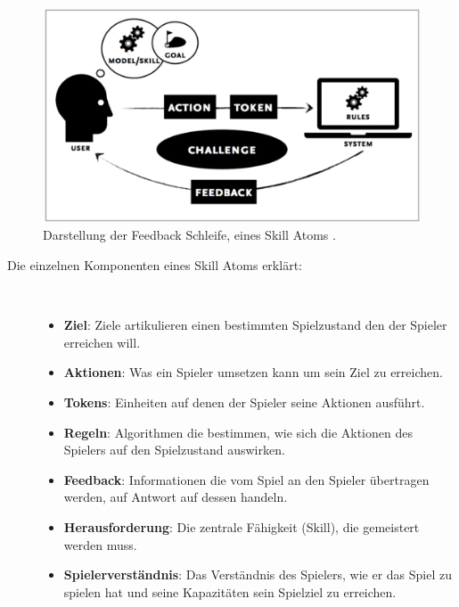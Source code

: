 \documentclass[a4paper,12pt]{scrartcl}
\begin{document}
\begin{figure}[h!]
\begin{center}
\includegraphics[scale = 0.6]{Bilder/SkillAtoms.eps}
\caption{Darstellung der Feedback Schleife, eines Skill Atoms \cite{Deterding2013}.}
\label{SkillAtomBild}
\end{center}
\end{figure}
\begin{description}
   \item[Die einzelnen Komponenten eines Skill Atoms erklärt:]~\par
   \begin{itemize}
      \item \textbf{Ziel}: Ziele artikulieren einen bestimmten Spielzustand den der Spieler erreichen will. 
      \item \textbf{Aktionen}: Was ein Spieler umsetzen kann um sein Ziel zu erreichen.
      \item \textbf{Tokens}: Einheiten auf denen der Spieler seine Aktionen ausführt.
      \item \textbf{Regeln}: Algorithmen die bestimmen, wie sich die Aktionen des Spielers auf den Spielzustand auswirken.
      \item \textbf{Feedback}: Informationen die vom Spiel an den Spieler übertragen werden, auf Antwort auf dessen handeln.	  
      \item \textbf{Herausforderung}: Die zentrale Fähigkeit (Skill), die gemeistert werden muss.
      \item \textbf{Spielerverständnis}: Das Verständnis des Spielers, wie er das Spiel zu spielen hat und seine Kapazitäten sein Spielziel zu erreichen.
   \end{itemize}
\end{description}
\end{document}
